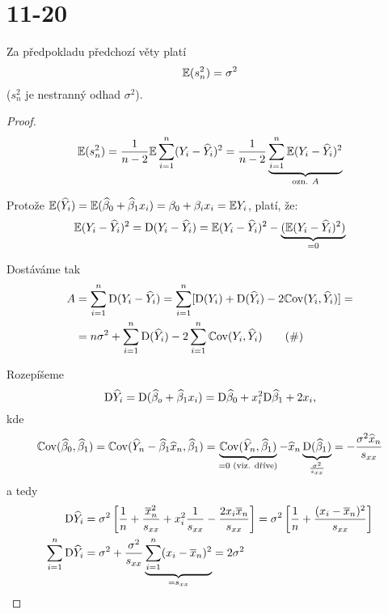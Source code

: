 \chapter{11-20}

\begin{theorem}
	Za předpokladu předchozí věty platí
	$$
		\mathbb{E} (s_n^2) = \sigma^2
	$$
	($s_n^2$ je nestranný odhad $\sigma^2$).
\end{theorem}


\begin{proof}
	$$
		\mathbb{E}(s_n^2)  = \frac{1}{n-2} \mathbb{E} \sum_{i=1}^{n} (Y_i - \widehat{Y}_i)^2 = \frac{1}{n-2} \underbrace{\sum\limits_{i=1}^{n} \mathbb{E} (Y_i - \widehat{Y}_i)^2}_{\text{ozn. } A}
	$$
	
	Protože $\mathbb{E}(\widehat{Y}_i)  = \mathbb{E}(\widehat{\beta}_0 + \widehat{\beta}_1 x_i) = \beta_0 + \beta_i x_i = \mathbb{E} Y_i$, platí, že:
	$$
	\mathbb{E}(Y_i - \widehat{Y}_i)^2   = \mathrm{D}(Y_i - \widehat{Y}_i) = \mathbb{E} (Y_i - \widehat{Y}_i)^2 - \underbrace{(\mathbb{E}(Y_i - \widehat{Y}_i)^2)}_{= 0}
	$$
	
	Dostáváme tak	
	\begin{align*}
		A & = \sum_{i=1}^{n} \mathrm{D}(Y_i - \widehat{Y}_i) = \sum_{i=1}^n [ \mathrm{D}(Y_i) + \mathrm{D}(\widehat{Y}_i) - 2 \mathbb{C}\mathrm{ov}(Y_i, \widehat{Y}_i) ] =  \\
		& = n \sigma^2 + \sum_{i=1}^n \mathrm{D}(\widehat{Y}_i) - 2 \sum_{i=1}^n \mathbb{C}\mathrm{ov}(Y_i, \widehat{Y}_i) \tag{$\#$}
	\end{align*}
	
	Rozepíšeme
	$$
		\mathrm{D} \widehat{Y}_i  = \mathrm{D}(\widehat{\beta}_o + \widehat{\beta}_1 x_i) = \mathrm{D} \widehat{\beta}_0 + x_i^2 \mathrm{D} \widehat{\beta}_1 + 2 x_i,
	$$
	kde
	$$
		\mathbb{C}\mathrm{ov}(\widehat{\beta}_0, \widehat{\beta}_1) = \mathbb{C}\mathrm{ov}(\widehat{Y}_n - \widehat{\beta}_1 \widehat{x}_n, \widehat{\beta}_1) = \underbrace{\mathbb{C}\mathrm{ov}(\widehat{Y}_n, \widehat{\beta}_1)}_{= 0 \text{ (viz. dříve)}} - \widehat{x}_n \underbrace{\mathrm{D}(\widehat{\beta}_1)}_{\frac{\sigma^2}{s_{xx}}} = -\frac{\sigma^2 \widehat{x}_n}{s_{xx}}
	$$
	a tedy
	\begin{align*}
		\mathrm{D} \widehat{Y}_i & = \sigma^2 \left[ \frac{1}{n} + \frac{\overline{x}_n^2}{s_{xx}} + x_i^2 \frac{1}{s_{xx}} - \frac{2 x_i \overline{x}_n}{s_{xx}} \right] = \sigma^2 \left[ \frac{1}{n} + \frac{(x_i - \overline{x}_n)^2}{s_{xx}}\right] \\
		\sum_{i=1}^n \mathrm{D} \widehat{Y}_i & = \sigma^2 + \frac{\sigma^2}{s_{xx}} \underbrace{\sum_{i=1}^n (x_i - \overline{x}_n)^2}_{ = s_{xx}} = 2\sigma^2
	\end{align*}
	

\end{proof}
